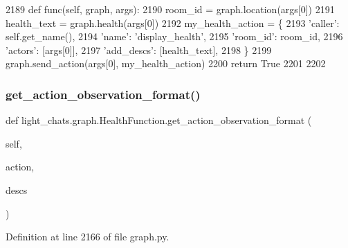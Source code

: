 \begin{DoxyCode}
2189     \textcolor{keyword}{def }func(self, graph, args):
2190         room\_id = graph.location(args[0])
2191         health\_text = graph.health(args[0])
2192         my\_health\_action = \{
2193             \textcolor{stringliteral}{'caller'}: self.get\_name(),
2194             \textcolor{stringliteral}{'name'}: \textcolor{stringliteral}{'display\_health'},
2195             \textcolor{stringliteral}{'room\_id'}: room\_id,
2196             \textcolor{stringliteral}{'actors'}: [args[0]],
2197             \textcolor{stringliteral}{'add\_descs'}: [health\_text],
2198         \}
2199         graph.send\_action(args[0], my\_health\_action)
2200         \textcolor{keywordflow}{return} \textcolor{keyword}{True}
2201 
2202 
\end{DoxyCode}
\mbox{\label{classlight__chats_1_1graph_1_1HealthFunction_a436cadbb6f2ae2cb77521c013caa8063}} 
\subsubsection{\texorpdfstring{get\+\_\+action\+\_\+observation\+\_\+format()}{get\_action\_observation\_format()}}
{\footnotesize\ttfamily def light\+\_\+chats.\+graph.\+Health\+Function.\+get\+\_\+action\+\_\+observation\+\_\+format (\begin{DoxyParamCaption}\item[{}]{self,  }\item[{}]{action,  }\item[{}]{descs }\end{DoxyParamCaption})}



Definition at line 2166 of file graph.\+py.


